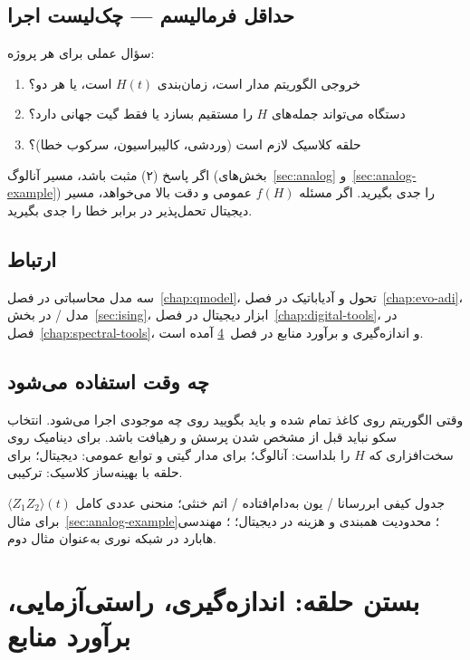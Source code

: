 \section{حداقل فرمالیسم --- چک‌لیست اجرا}

سؤال عملی برای هر پروژه:
\begin{enumerate}
	\item خروجی الگوریتم مدار است، زمان‌بندی $H(t)$ است، یا هر دو؟
	\item دستگاه می‌تواند جمله‌های $H$ را مستقیم بسازد یا فقط گیت جهانی دارد؟
	\item حلقه کلاسیک لازم است (وردشی، کالیبراسیون، سرکوب خطا)؟
\end{enumerate}
اگر پاسخ (۲) مثبت باشد، مسیر آنالوگ (بخش‌های~\ref{sec:analog} و~\ref{sec:analog-example}) را جدی بگیرید. اگر مسئله $f(H)$ عمومی و دقت بالا می‌خواهد، مسیر دیجیتال تحمل‌پذیر در برابر خطا را جدی بگیرید.

\section{ارتباط}

سه مدل محاسباتی در فصل~\ref{chap:qmodel}، تحول و آدیاباتیک در فصل~\ref{chap:evo-adi}، مدل / در بخش~\ref{sec:ising}، ابزار دیجیتال در فصل~\ref{chap:digital-tools}،  در فصل~\ref{chap:spectral-tools}، و اندازه‌گیری و برآورد منابع در فصل~\ref{chap:closing} آمده است.

\section{چه وقت استفاده می‌شود}

وقتی الگوریتم روی کاغذ تمام شده و باید بگویید روی چه موجودی اجرا می‌شود. انتخاب سکو نباید قبل از مشخص شدن پرسش و رهیافت باشد. برای دینامیک روی سخت‌افزاری که $H$ را بلداست: آنالوگ؛ برای مدار گیتی و توابع عمومی: دیجیتال؛ برای حلقه با بهینه‌ساز کلاسیک: ترکیبی.

\begin{remark}
جدول کیفی ابررسانا / یون به‌دام‌افتاده / اتم خنثی؛ منحنی عددی کامل $\langle Z_1Z_2\rangle(t)$ برای مثال~\ref{sec:analog-example}؛ محدودیت همبندی و هزینه  در دیجیتال؛ ؛ مهندسی هابارد در شبکه نوری به‌عنوان مثال دوم.
\end{remark}

\chapter{بستن حلقه: اندازه‌گیری، راستی‌آزمایی، برآورد منابع}
\label{chap:closing}

